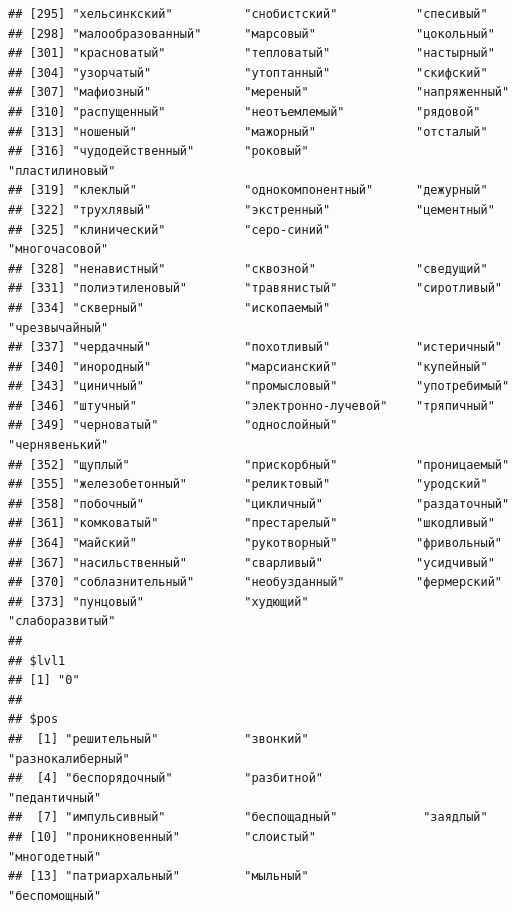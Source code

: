 \documentclass[11pt]{article}\usepackage[]{graphicx}\usepackage[]{color}
\makeatletter
\newenvironment{kframe}{%
 \def\at@end@of@kframe{}%
 \ifinner\ifhmode%
  \def\at@end@of@kframe{\end{minipage}}%
  \begin{minipage}{\columnwidth}%
 \fi\fi%
 \def\FrameCommand##1{\hskip\@totalleftmargin \hskip-\fboxsep
 \colorbox{shadecolor}{##1}\hskip-\fboxsep
     \hskip-\linewidth \hskip-\@totalleftmargin \hskip\columnwidth}%
 \MakeFramed {\advance\hsize-\width
   \@totalleftmargin\z@ \linewidth\hsize
   \@setminipage}}%
 {\par\unskip\endMakeFramed%
 \at@end@of@kframe}
\newenvironment{knitrout}{}{} %
\makeatother
\begin{document}
\begin{knitrout}
\begin{kframe}
\begin{verbatim}
## [295] "хельсинкский"          "снобистский"           "спесивый"             
## [298] "малообразованный"      "марсовый"              "цокольный"            
## [301] "красноватый"           "тепловатый"            "настырный"            
## [304] "узорчатый"             "утоптанный"            "скифский"             
## [307] "мафиозный"             "мереный"               "напряженный"          
## [310] "распущенный"           "неотъемлемый"          "рядовой"              
## [313] "ношеный"               "мажорный"              "отсталый"             
## [316] "чудодейственный"       "роковый"               "пластилиновый"        
## [319] "клеклый"               "однокомпонентный"      "дежурный"             
## [322] "трухлявый"             "экстренный"            "цементный"            
## [325] "клинический"           "серо-синий"            "многочасовой"         
## [328] "ненавистный"           "сквозной"              "сведущий"             
## [331] "полиэтиленовый"        "травянистый"           "сиротливый"           
## [334] "скверный"              "ископаемый"            "чрезвычайный"         
## [337] "чердачный"             "похотливый"            "истеричный"           
## [340] "инородный"             "марсианский"           "купейный"             
## [343] "циничный"              "промысловый"           "употребимый"          
## [346] "штучный"               "электронно-лучевой"    "тряпичный"            
## [349] "черноватый"            "однослойный"           "чернявенький"         
## [352] "щуплый"                "прискорбный"           "проницаемый"          
## [355] "железобетонный"        "реликтовый"            "уродский"             
## [358] "побочный"              "цикличный"             "раздаточный"          
## [361] "комковатый"            "престарелый"           "шкодливый"            
## [364] "майский"               "рукотворный"           "фривольный"           
## [367] "насильственный"        "сварливый"             "усидчивый"            
## [370] "соблазнительный"       "необузданный"          "фермерский"           
## [373] "пунцовый"              "худющий"               "слаборазвитый"        
## 
## $lvl1
## [1] "0"
## 
## $pos
##  [1] "решительный"            "звонкий"                "разнокалиберный"       
##  [4] "беспорядочный"          "разбитной"              "педантичный"           
##  [7] "импульсивный"           "беспощадный"            "заядлый"               
## [10] "проникновенный"         "слоистый"               "многодетный"           
## [13] "патриархальный"         "мыльный"                "беспомощный"           

\end{verbatim}
\end{kframe}
\end{knitrout}
\end{document}
